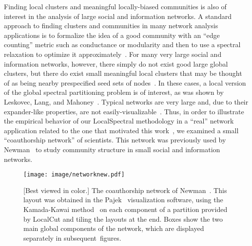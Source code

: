 \documentclass[11pt]{article}
\begin{document}
Finding local clusters and meaningful locally-biased communities is also of 
interest in the analysis of large social and information networks.  
A standard approach to finding clusters and communities in many network 
analysis applications is to formalize the idea of a good community with an 
``edge counting'' metric such as conductance or modularity and then to use a 
spectral relaxation to optimize it
approximately~\cite{newman2006finding,newman2006_ModularityPNAS}.
For many very large social and information networks, however, there simply do
not exist good large global clusters, but there do exist small
meaningful local clusters that may be thought of as being nearby 
prespecified seed sets of
nodes~\cite{LLDM08_communities_CONF,LLDM09_communities_IM,LLM10_communities_CONF}.
In these cases, a local version of the global spectral partitioning
problem is of interest, as was shown by Leskovec, Lang, and
Mahoney~\cite{LLM10_communities_CONF}.
Typical networks are very large and, due to their expander-like properties, 
are not 
easily-visualizable~\cite{LLDM08_communities_CONF,LLDM09_communities_IM}.
Thus, in order to illustrate the empirical behavior of our
\textsf{LocalSpectral} methodology in a ``real'' network application related 
to the one that motivated this 
work~\cite{LLDM08_communities_CONF,LLDM09_communities_IM,LLM10_communities_CONF}, 
we examined a small ``coauthorship network'' of scientists.
This network was previously used by Newman~\cite{newman2006finding} to study 
community structure in small social and information networks.


\begin{figure}[h] 
\begin{center}
\texttt{[image: image/networknew.pdf]} 
\end{center}
\caption{[Best viewed in color.]  The coauthorship network of Newman~\cite{newman2006finding}. This layout was obtained in the Pajek~\cite{Pajek03} visualization software, using the Kamada-Kawai method~\cite{Kamada89} on each component of a partition provided by \textsf{LocalCut} and tiling the layouts at the end.  Boxes show the two main global components of the network, which are displayed separately in subsequent~figures.}
\label{fig:network}
\end{figure}
\end{document}
